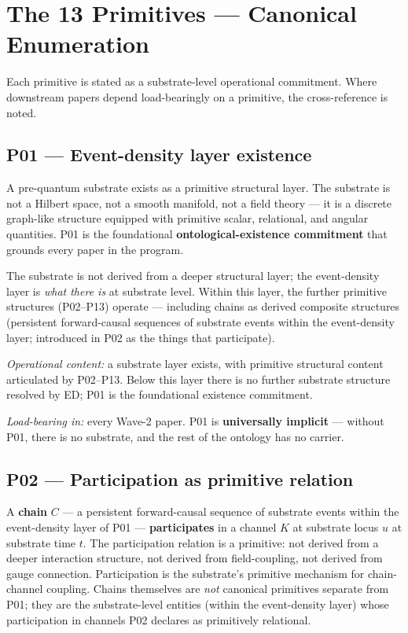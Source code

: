 \documentclass[11pt,a4paper]{article}
\begin{document}
\section{The 13 Primitives --- Canonical Enumeration}

Each primitive is stated as a substrate-level operational commitment. Where downstream papers depend load-bearingly on a primitive, the cross-reference is noted.

\subsection*{P01 --- Event-density layer existence}

A pre-quantum substrate exists as a primitive structural layer. The substrate is not a Hilbert space, not a smooth manifold, not a field theory --- it is a discrete graph-like structure equipped with primitive scalar, relational, and angular quantities. P01 is the foundational \textbf{ontological-existence commitment} that grounds every paper in the program.

The substrate is not derived from a deeper structural layer; the event-density layer is \emph{what there is} at substrate level. Within this layer, the further primitive structures (P02--P13) operate --- including chains as derived composite structures (persistent forward-causal sequences of substrate events within the event-density layer; introduced in P02 as the things that participate).

\emph{Operational content:} a substrate layer exists, with primitive structural content articulated by P02--P13. Below this layer there is no further substrate structure resolved by ED; P01 is the foundational existence commitment.

\emph{Load-bearing in:} every Wave-2 paper. P01 is \textbf{universally implicit} --- without P01, there is no substrate, and the rest of the ontology has no carrier.

\subsection*{P02 --- Participation as primitive relation}

A \textbf{chain} $C$ --- a persistent forward-causal sequence of substrate events within the event-density layer of P01 --- \textbf{participates} in a channel $K$ at substrate locus $u$ at substrate time $t$. The participation relation is a primitive: not derived from a deeper interaction structure, not derived from field-coupling, not derived from gauge connection. Participation is the substrate's primitive mechanism for chain-channel coupling. Chains themselves are \emph{not} canonical primitives separate from P01; they are the substrate-level entities (within the event-density layer) whose participation in channels P02 declares as primitively relational.
\end{document}
